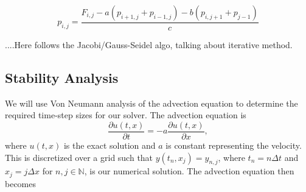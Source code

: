 \begin{equation}
    p_{i,j} = \frac{F_{i,j} - a(p_{i+1,j} + p_{i-1,j}) - b(p_{i,j+1}+p_{j-1})}{c}
\end{equation}

....Here follows the Jacobi/Gauss-Seidel algo, talking about iterative method.

\subsection{Stability Analysis}
\label{subsec:von_neumann}

We will use Von Neumann analysis of the advection equation to determine the required time-step sizes for our solver. The advection equation is
\begin{equation}
    \frac{\partial u(t,x)}{\partial t} = -a \frac{\partial u(t,x)}{\partial x},
\end{equation}
where $u(t,x)$ is the exact solution and $a$ is constant representing the velocity. This is discretized over a grid such that $y(t_n,x_j)=y_{n,j}$, where $t_n = n\Delta t$ and $x_j = j\Delta x$ for $n,j\in\mathbb{N}$, is our numerical solution. The advection equation then becomes

